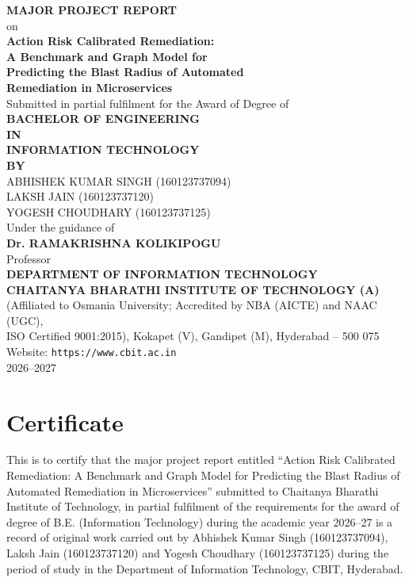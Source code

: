 \documentclass[12pt,a4paper]{report}
\begin{document}
\pagestyle{empty}
\begin{center}
\vspace*{1.6cm}
{\large\bfseries MAJOR PROJECT REPORT}\\[10pt]
on\\[14pt]
{\LARGE\bfseries Action Risk Calibrated Remediation:\\[4pt] A Benchmark and Graph Model for\\[4pt] Predicting the Blast Radius of Automated\\[4pt] Remediation in Microservices}\\[26pt]
Submitted in partial fulfilment for the Award of Degree of\\[20pt]
{\large\bfseries BACHELOR OF ENGINEERING}\\[6pt]
{\large\bfseries IN}\\[6pt]
{\large\bfseries INFORMATION TECHNOLOGY}\\[24pt]
{\bfseries BY}\\[8pt]
ABHISHEK KUMAR SINGH (160123737094)\\
LAKSH JAIN (160123737120)\\
YOGESH CHOUDHARY (160123737125)\\[22pt]
Under the guidance of\\[8pt]
{\bfseries Dr. RAMAKRISHNA KOLIKIPOGU}\\
Professor\\[24pt]
{\bfseries DEPARTMENT OF INFORMATION TECHNOLOGY}\\[4pt]
{\bfseries CHAITANYA BHARATHI INSTITUTE OF TECHNOLOGY (A)}\\[4pt]
{\small (Affiliated to Osmania University; Accredited by NBA (AICTE) and NAAC (UGC),\\
ISO Certified 9001:2015), Kokapet (V), Gandipet (M), Hyderabad -- 500 075}\\
{\small Website: \texttt{https://www.cbit.ac.in}}\\[14pt]
2026--2027
\end{center}
\newpage

\pagestyle{plain}

\chapter*{Certificate}
\thispagestyle{plain}
\vspace{-6pt}
This is to certify that the major project report entitled \textquotedblleft Action Risk Calibrated Remediation: A Benchmark and Graph Model for Predicting the Blast Radius of Automated Remediation in Microservices\textquotedblright{} submitted to Chaitanya Bharathi Institute of Technology, in partial fulfilment of the requirements for the award of degree of B.E. (Information Technology) during the academic year 2026--27 is a record of original work carried out by Abhishek Kumar Singh (160123737094), Laksh Jain (160123737120) and Yogesh Choudhary (160123737125) during the period of study in the Department of Information Technology, CBIT, Hyderabad.
\end{document}
